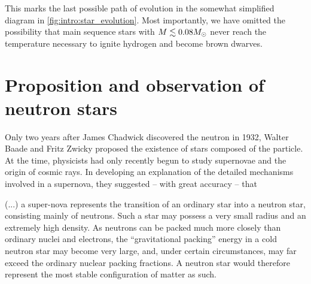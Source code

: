 This marks the last possible path of evolution in the somewhat simplified diagram in \cref{fig:intro:star_evolution}.
Most importantly, we have omitted the possibility that main sequence stars with $M \lesssim 0.08 M_\odot$ never reach the temperature necessary to ignite hydrogen and become brown dwarves.

\section{Proposition and observation of neutron stars}

Only two years after James Chadwick discovered the neutron in 1932, \cite{ref:neutron_discovery}
Walter Baade and Fritz Zwicky proposed the existence of stars composed of the particle.
At the time, physicists had only recently begun to study supernovae and the origin of cosmic rays.
In developing an explanation of the detailed mechanisms involved in a supernova, they suggested -- with great accuracy -- that
\cite[page 263]{ref:supernova_cosmic_rays_neutron_stars}
\begin{displayquote}
(...) %
a super-nova represents the transition of an ordinary star into a neutron star, consisting mainly of neutrons.
Such a star may possess a very small radius and an extremely high density.
As neutrons can be packed much more closely than ordinary nuclei and electrons, the ``gravitational packing'' energy in a cold neutron star may become very large, and, under certain circumstances, may far exceed the ordinary nuclear packing fractions.
A neutron star would therefore represent the most stable configuration of matter as such.
\end{displayquote}

\iffalse
The first theoretical model of a neutron star was developed by Oppenheimer and Volkoff in 1939. \cite{ref:tov}
Assuming a neutron star consists entirely of a non-interacting cold Fermi gas, they found an equation of state governing its internals and solved the Einstein field equations in a radially symmetric perfect fluid to find the mass and radii of neutron stars.
In such a cold gas, thermal motion contributes nothing to the pressure, so any pressure is only due to the Pauli exclusion principle, stating that no fermions can be in the same quantum state.
Analogously to the Chandrasekhar limit, their results implied that this degeneracy pressure could only support masses up to $M < 0.7 \solarmass$.
\fi

